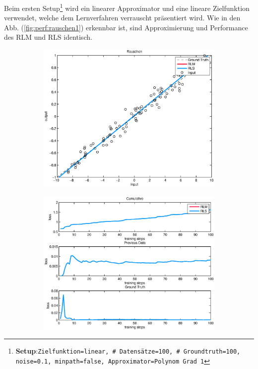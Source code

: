 \documentclass[a4paper, 12pt]{article}
\begin{document}
{Beim ersten Setup\footnote{\textbf{Setup}:\quad\texttt{Zielfunktion=linear, \# Datensätze=100, \# Groundtruth=100, noise=0.1, minpath=false, Approximator=Polynom Grad 1}} wird ein linearer Approximator und eine lineare Zielfunktion verwendet, welche dem Lernverfahren verrauscht präsentiert wird. Wie in den Abb. (\ref{fig:perf:rauschen1}) erkennbar ist, sind Approximierung und Performance des RLM und RLS identisch.
\begin{figure}[H]
        \centering
        \begin{subfigure}[b]{0.4\textwidth}
                \centering
                \includegraphics[width=\textwidth]{./images/copyofstats/rauschen1_approx_100.eps}
                \caption{}
                \label{fig:perf:rauschen1:approx}
        \end{subfigure}
        \begin{subfigure}[b]{0.4\textwidth}
                \centering
                \includegraphics[width=\textwidth]{./images/copyofstats/rauschen1_perf_100.eps}

\end{subfigure}
\end{figure}}
\end{document}
